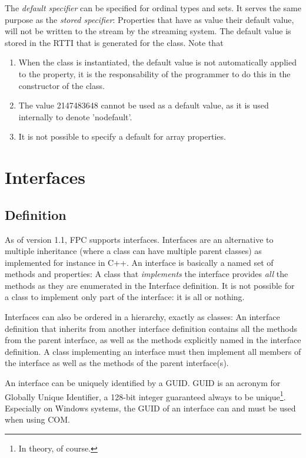 The {\em default specifier} can be specified for ordinal types and sets.
It serves the same purpose as the {\em stored specifier}: Properties that
have as value their default value, will not be written to the stream by the
streaming system. The default value is stored in the RTTI that is generated
for the class. Note that
\begin{enumerate}
\item When the class is instantiated, the default value is not automatically
applied to the property, it is the responsability of the programmer to do
this in the constructor of the class.
\item The value 2147483648 cannot be used as a default value, as it is used
internally to denote 'nodefault'.
\item It is not possible to specify a default for array properties.
\end{enumerate}


\chapter{Interfaces}
\label{ch:Interfaces}
\section{Definition}
As of version 1.1, FPC supports interfaces. Interfaces are an 
alternative to multiple inheritance (where a class can have multiple
parent classes) as implemented for instance in C++.  An interface is
basically a named set of methods and properties: A class that 
{\em implements} the interface provides {\em all} the methods as 
they are enumerated in the Interface definition. It is not possible for a
class to implement only part of the interface: it is all or nothing.

Interfaces can also be ordered in a hierarchy, exactly as classes:
An interface definition that inherits from another interface definition
contains all the methods from the parent interface, as well as the methods
explicitly named in the interface definition. A class implementing an
interface must then implement all members of the interface as well as the
methods of the parent interface(s).

An interface can be uniquely identified by a GUID. GUID is an acronym for
Globally Unique Identifier, a 128-bit integer guaranteed always to be 
unique\footnote{In theory, of course.}. Especially on Windows systems, 
the GUID of an interface can and must be used when using COM.

